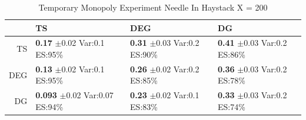 \documentclass[11pt,letterpaper]{article}
\begin{document}
\begin{table}[H]
\centering
\caption{Temporary Monopoly Experiment Needle In Haystack X = 200} 
\begin{tabular}{rlll}
  \hline
 & TS & DEG &  DG \\ 
  \hline
TS & \makecell{\textbf{0.17} $\pm$0.02\\Var:0.1\\ES:95\%} & \makecell{\textbf{0.31} $\pm$0.03\\Var:0.2\\ES:90\%} & \makecell{\textbf{0.41} $\pm$0.03\\Var:0.2\\ES:86\%} \\ 
  DEG & \makecell{\textbf{0.13} $\pm$0.02\\Var:0.1\\ES:95\%} & \makecell{\textbf{0.26} $\pm$0.02\\Var:0.2\\ES:85\%} & \makecell{\textbf{0.36} $\pm$0.03\\Var:0.2\\ES:78\%} \\ 
   DG & \makecell{\textbf{0.093} $\pm$0.02\\Var:0.07\\ES:94\%} & \makecell{\textbf{0.23} $\pm$0.02\\Var:0.1\\ES:83\%} & \makecell{\textbf{0.33} $\pm$0.03\\Var:0.2\\ES:74\%} \\ 
   \hline
\end{tabular}
\end{table}
\end{document}

